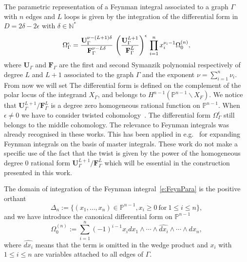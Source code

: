 \documentclass[a4paper,12pt]{article}
\numberwithin{equation}{section}
\numberwithin{figure}{section}
\begin{document}
The parametric representation of a Feynman integral associated to a
graph $\Gamma$ with $n$ edges and $L$ loops is given by the integration of the differential
form  in  $D=2\delta-2\epsilon$ with $\delta\in\mathbb N^*$
\begin{equation}
  \Omega^\epsilon_\Gamma={\textbf{U}_\Gamma^{\nu-(L+1)\delta} \over \textbf{F}_\Gamma^{\nu-L\delta}}\,
  \left(\textbf{U}_\Gamma^{L+1}\over \textbf{F}_\Gamma^L\right)^{\epsilon} \, \prod_{i=1}^n x_i^{\nu_i-1} \Omega^{(n)}_0 , 
\end{equation}
%
where $\textbf{U}_\Gamma$ and $\textbf{F}_\Gamma$ are the first and second Symanzik
polynomial respectively of degree $L$ and $L+1$ associated to the
graph $\Gamma$ and the exponent $\nu=\sum_{i=1}^n \nu_i$. From now we will set
The differential form is defined on the complement of the polar locus
of the integrand $X_\Gamma$, and belongs to $H^{n-1}( \mathbb
P^{n-1}\backslash X_F)$. We notice that   $\textbf{U}_\Gamma^{L+1}/\textbf{F}_\Gamma^L$ is a degree
zero homogeneous rational function on $\mathbb
P^{n-1}$. When $\epsilon\neq0$ we have to consider twisted
cohomology~\cite{Aomoto1,Aomoto,Aomoto_1982,AomotoBook}. The differential form
$\Omega_\Gamma^\epsilon$ still belongs to the middle cohomology. The
relevance to Feynman integrals was already recognised in these works. 
This has been applied in
e.g.~\cite{Mizera:2017rqa,Frellesvig:2019uqt,Cacciatori:2021nli}  for
expanding Feynman integrals on the basis of master integrals. These
work do not make a specific use of the fact that the twist is given by
the power of the homogeneous degree 0 rational form
$\textbf{U}_\Gamma^{L+1}/\textbf{F}_\Gamma^L$ which will be essential
in the construction presented in this work.


The domain of integration of the Feynman integral~\eqref{e:FeynPara}  is the positive orthant
\begin{equation}\label{e:Deltan}
  \Delta_n:=\{(x_1,\dots,x_n)\in \mathbb P^{n-1}, x_i \geq0 ~\textrm{for}~ 1\leq
            i\leq n\},
          \end{equation}
          and we have introduce the canonical differential form on
          $\mathbb P^{n-1}$ 
 \begin{equation}
         \Omega_0^{(n)}:=  \sum_{i=1}^n (-1)^{i-1} x_i dx_1\wedge \cdots \wedge \widehat{dx_i} \wedge\cdots \wedge dx_n,
             \end{equation}
   where $\widehat{dx_i}$ means that the term is omitted in the wedge
    product
and $x_i$ with $1\leq i\leq n$  are  variables attached to all edges of
$\Gamma$.
\end{document}
